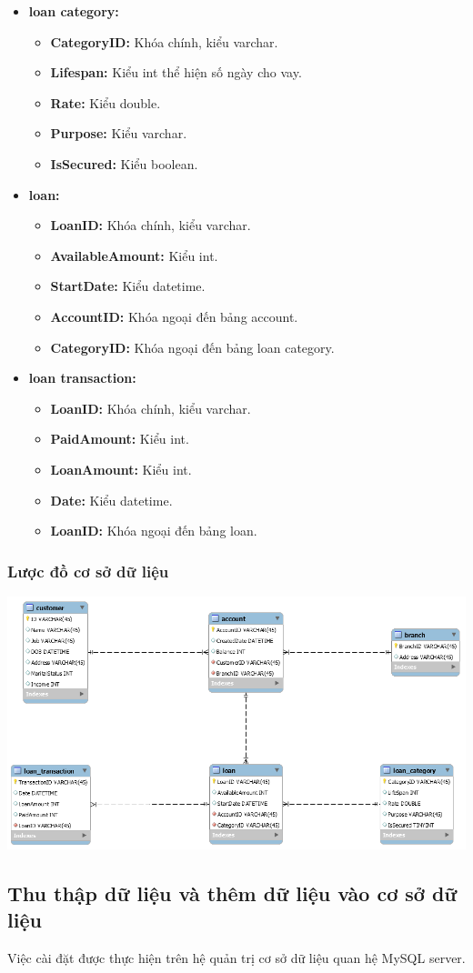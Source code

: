 \documentclass{article}
\begin{document}
\begin{itemize}
    \item \textbf{loan category:}
    \begin{itemize}
        \item \textbf{CategoryID:} Khóa chính, kiểu varchar.
        \item \textbf{Lifespan:} Kiểu int thể hiện số ngày cho vay.
        \item \textbf{Rate:} Kiểu double.
        \item \textbf{Purpose:} Kiểu varchar.
        \item \textbf{IsSecured:} Kiểu boolean.
    \end{itemize}
    
    \item \textbf{loan:}
    \begin{itemize}
        \item \textbf{LoanID:} Khóa chính, kiểu varchar.
        \item \textbf{AvailableAmount:} Kiểu int.
        \item \textbf{StartDate:} Kiểu datetime.
        \item \textbf{AccountID:} Khóa ngoại đến bảng account.
        \item \textbf{CategoryID:} Khóa ngoại đến bảng loan category.
    \end{itemize}
    
    \item \textbf{loan transaction:}
    \begin{itemize}
        \item \textbf{LoanID:} Khóa chính, kiểu varchar.
        \item \textbf{PaidAmount:} Kiểu int.
        \item \textbf{LoanAmount:} Kiểu int.
        \item \textbf{Date:} Kiểu datetime.
        \item \textbf{LoanID:} Khóa ngoại đến bảng loan.
    \end{itemize} 
\end{itemize}
\subsubsection{Lược đồ cơ sở dữ liệu}
\begin{center}
    \includegraphics[scale=0.5]{DBDiagram.png}
\end{center}

\subsection{Thu thập dữ liệu và thêm dữ liệu vào cơ sở dữ liệu}
Việc cài đặt được thực hiện trên hệ quản trị cơ sở dữ liệu quan hệ MySQL server.
\end{document}
